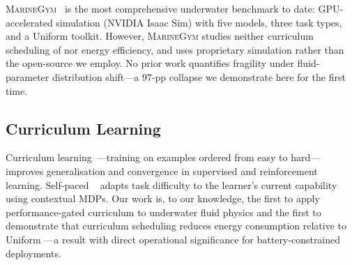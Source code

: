 \textsc{MarineGym}~\cite{chu2025} is the most comprehensive underwater
\RL{} benchmark to date: GPU-accelerated simulation (NVIDIA Isaac Sim)
with five \AUV{} models, three task types, and a Uniform \DR{} toolkit.
However, \textsc{MarineGym} studies neither curriculum scheduling of
\DR{} nor energy efficiency, and uses proprietary simulation rather than
the open-source \MuJoCo{} we employ.
No prior work quantifies \PID{} fragility under fluid-parameter
distribution shift---a $97$-pp collapse we demonstrate here for the
first time.

\subsection{Curriculum Learning}

Curriculum learning~\cite{bengio2009}---training on examples ordered
from easy to hard---improves generalisation and convergence in
supervised and reinforcement learning.
Self-paced \RL{}~\cite{klink2020} adapts task difficulty to the
learner's current capability using contextual MDPs.
Our work is, to our knowledge, the first to apply performance-gated
curriculum \DR{} to underwater fluid physics and the first to
demonstrate that curriculum scheduling reduces energy consumption
relative to Uniform \DR{}---a result with direct operational significance
for battery-constrained \AUV{} deployments.